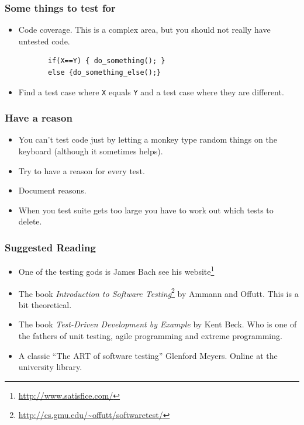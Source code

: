 \documentclass{beamer}
\begin{document}
\begin{frame}[fragile]
  \frametitle{Some things to test for}
  \begin{itemize}
  \item Code coverage. This is a complex area, but you should not
    really have untested code.
    \begin{lstlisting}
       if(X==Y) { do_something(); } 
       else {do_something_else();}
    \end{lstlisting}
\item Find a test case where {\tt X} equals {\tt Y} and a test case
  where they are different.
  \end{itemize}
\end{frame}
\begin{frame}
  \frametitle{Have a reason}
  \begin{itemize}
  \item You can't test code just by letting a monkey type random
    things on the keyboard (although it sometimes helps).
  \item Try to have a reason for every test.
  \item Document reasons.
  \item When you test suite gets too large you have to work out which
    tests to delete.
  \end{itemize}
\end{frame}
\begin{frame}
  \frametitle{Suggested Reading}
  \begin{itemize}
  \item One of the testing gods is James Bach see his
    website\footnote{\url{http://www.satisfice.com/}}
  \item The book {\em Introduction to Software
      Testing}\footnote{\url{http://cs.gmu.edu/~offutt/softwaretest/}}
    by Ammann and Offutt. This is a bit theoretical. 
  \item The book {\em Test-Driven Development by Example} by Kent Beck.
    Who is one of the  fathers of unit testing, agile programming  and
    extreme programming. 
    \item A classic ``The ART of software testing'' Glenford Meyers.  Online
      at the university library. 
  \end{itemize}
\end{frame}
\end{document}
